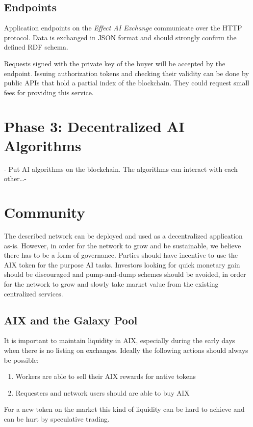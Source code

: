 \documentclass{article}
\begin{document}
\subsection{Endpoints}
Application endpoints on the \emph{Effect AI Exchange} communicate
over the HTTP protocol. Data is exchanged in JSON format and should
strongly confirm the defined RDF schema.

Requests signed with the private key of the buyer will be accepted by
the endpoint. Issuing authorization tokens and checking their validity
can be done by public APIs that hold a partial index of the
blockchain. They could request small fees for providing this service.


\section{Phase 3: Decentralized AI Algorithms}
\label{sec:phase3}
- Put AI algorithms on the blockchain. The algorithms can interact with each other\dots -

\section{Community}
The described network can be deployed and used as a decentralized
application as-is. However, in order for the network to grow and be
sustainable, we believe there has to be a form of governance. Parties
should have incentive to use the AIX token for the purpose AI
tasks. Investors looking for quick monetary gain should be discouraged
and pump-and-dump schemes should be avoided, in order for the network
to grow and slowly take market value from the existing centralized
services.

\subsection{AIX and the Galaxy Pool}
It is important to maintain liquidity in AIX, especially during the
early days when there is no listing on exchanges. Ideally the
following actions should always be possible:

\begin{enumerate}
\item Workers are able to sell their AIX rewards for native tokens
\item Requesters and network users should are able to buy AIX
\end{enumerate}

For a new token on the market this kind of liquidity can be hard to
achieve and can be hurt by speculative trading.
\end{document}
